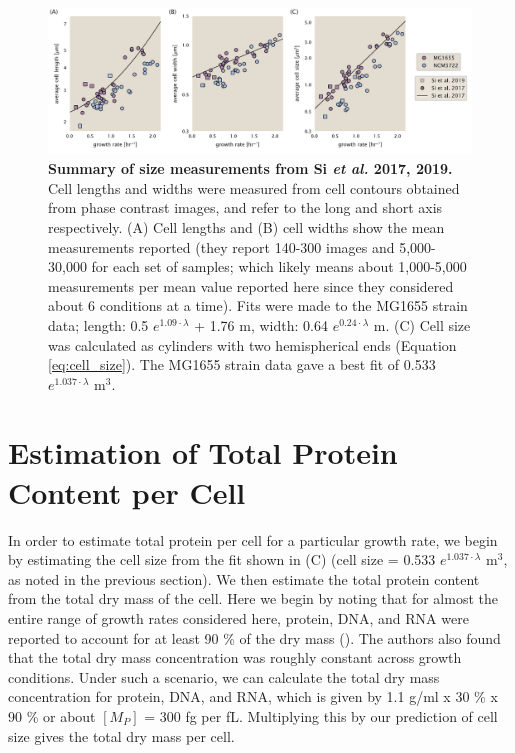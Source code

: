 \begin{figure}
		\centering
    \includegraphics[width=1.0\textwidth]{SI_figs/figA3_Si_size_data_fit.pdf}
    \caption{\textbf{Summary of size measurements from Si \textit{et al.} 2017,
    2019.} Cell lengths and widths were measured from cell contours obtained from
    phase contrast images, and refer to the long and short axis respectively. (A)
    Cell lengths and (B) cell widths show the mean measurements reported (they
    report 140-300 images and 5,000-30,000 for each set of samples; which likely
    means about 1,000-5,000 measurements per mean value reported here since they
    considered about 6 conditions at a time). Fits were made to the  MG1655 strain
    data; length: 0.5 $e^{1.09 \cdot \lambda}$ + 1.76 \textmu m, width:  0.64
    $e^{0.24 \cdot \lambda}$ \textmu m. (C) Cell size was calculated as
    cylinders with two hemispherical ends (Equation \ref{eq:cell_size}). The
    MG1655 strain data gave a best fit of 0.533 $e^{1.037 \cdot \lambda}$ \textmu m$^3$.}
  \label{fig:final_size_data_Si}
\end{figure}


\section{Estimation of Total Protein Content per Cell}
\label{sec:estimate_protein_per_cell}
In order to estimate total protein per cell for a particular growth rate, we
begin by estimating the cell size from the fit shown in
(C) (cell size = 0.533 $e^{1.037 \cdot \lambda}$ \textmu m$^3$,
as noted in the previous section). We
then estimate the total protein content from the total dry mass of the cell.
Here we begin by noting that  for almost the entire range of growth rates
considered here, protein, DNA, and RNA were reported to account for at least 90
\% of the dry mass (\cite{basan2015}). The authors also found that the total dry
mass concentration was roughly constant across growth conditions. Under such a
scenario, we can calculate the total dry mass concentration for protein, DNA,
and RNA, which is given by 1.1 g/ml x 30 \% x 90 \% or about $[M_P]$ = 300 fg
per fL. Multiplying this by our prediction of cell size gives the total dry mass
per cell.

